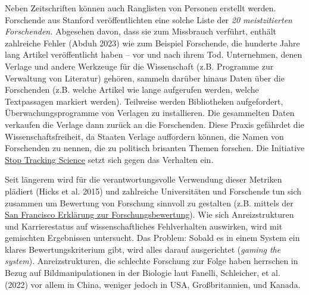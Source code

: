\documentclass[
  letterpaper,
  DIV=11,
  numbers=noendperiod]{scrreprt}
\begin{document}
Neben Zeitschriften können auch Ranglisten von Personen erstellt werden.
Forschende aus Stanford veröffentlichten eine solche Liste der \emph{20
meistzitierten Forschenden.} Abgesehen davon, dass sie zum Missbrauch
verführt, enthält zahlreiche Fehler (Abduh 2023) wie zum Beispiel
Forschende, die hunderte Jahre lang Artikel veröffentlicht haben -- vor
und nach ihrem Tod. Unternehmen, denen Verlage und andere Werkzeuge für
die Wissenschaft (z.B. Programme zur Verwaltung von Literatur) gehören,
sammeln darüber hinaus Daten über die Forschenden (z.B. welche Artikel
wie lange aufgerufen werden, welche Textpassagen markiert werden).
Teilweise werden Bibliotheken aufgefordert, Überwachungsprogramme von
Verlagen zu installieren. Die gesammelten Daten verkaufen die Verlage
dann zurück an die Forschenden. Diese Praxis gefährdet die
Wissenschaftsfreiheit, da Staaten Verlage auffordern können, die Namen
von Forschenden zu nennen, die zu politisch brisanten Themen forschen.
Die Initiative \href{https://stoptrackingscience.eu}{Stop Tracking
Science} setzt sich gegen das Verhalten ein.

Seit längerem wird für die verantwortungsvolle Verwendung dieser
Metriken plädiert (Hicks et al. 2015) und zahlreiche Universitäten und
Forschende tun sich zusammen um Bewertung von Forschung sinnvoll zu
gestalten (z.B. mittels der
\href{https://sfdora.org/read/read-the-declaration-deutsch/}{San
Francisco Erklärung zur Forschungsbewertung}). Wie sich Anreizstrukturen
und Karrierestatus auf wissenschaftliches Fehlverhalten auswirken, wird
mit gemischten Ergebnissen untersucht. Das Problem: Sobald es in einem
System ein klares Bewertungskriterium gibt, wird alles darauf
ausgerichtet (\emph{gaming the system}). Anreizstrukturen, die schlechte
Forschung zur Folge haben herrschen in Bezug auf Bildmanipulationen in
der Biologie laut Fanelli, Schleicher, et al. (2022) vor allem in China,
weniger jedoch in USA, Großbritannien, und Kanada.
\end{document}

